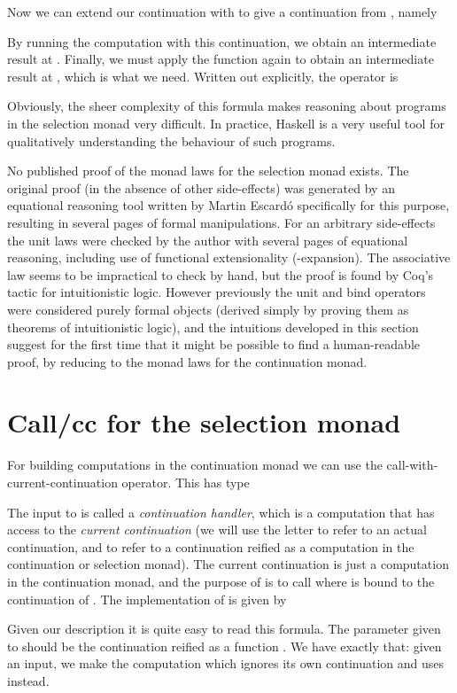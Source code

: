 \documentclass{article}
\begin{document}
Now we can extend our continuation  with  to give a continuation  from , namely

By running the computation  with this continuation, we obtain an intermediate result at . Finally, we must apply the function  again to obtain an intermediate result at , which is what we need. Written out explicitly, the operator is


Obviously, the sheer complexity of this formula makes reasoning about programs in the selection monad very difficult. In practice, Haskell is a very useful tool for qualitatively understanding the behaviour of such programs.

No published proof of the monad laws for the selection monad exists. The original proof (in the absence of other side-effects) was generated by an equational reasoning tool written by Martin Escard\'o specifically for this purpose, resulting in several pages of formal manipulations. For an arbitrary side-effects the unit laws were checked by the author with several pages of equational reasoning, including use of functional extensionality (-expansion). The associative law seems to be impractical to check by hand, but the proof is found by Coq's tactic for intuitionistic logic. However previously the unit and bind operators were considered purely formal objects (derived simply by proving them as theorems of intuitionistic logic), and the intuitions developed in this section suggest for the first time that it might be possible to find a human-readable proof, by reducing to the monad laws for the continuation monad.

\section{Call/cc for the selection monad}\label{callcc1}


For building computations in the continuation monad we can use the call-with-current-continuation operator. This has type

The input  to  is called a \emph{continuation handler}, which is a computation that has access to the \emph{current continuation}  (we will use the letter  to refer to an actual continuation, and  to refer to a continuation reified as a computation in the continuation or selection monad). The current continuation is just a computation  in the continuation monad, and the purpose of  is to call  where  is bound to the continuation of . The implementation of  is given by

Given our description it is quite easy to read this formula. The parameter given to  should be the continuation  reified as a function . We have exactly that: given an input, we make the computation which ignores its own continuation and uses  instead.
\end{document}
